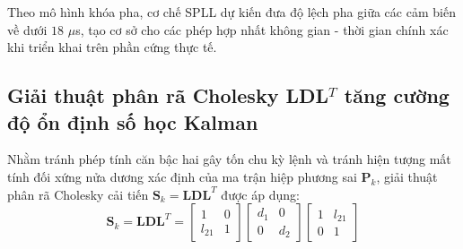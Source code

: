 \begin{table}[H]
\centering
\caption{Ước lượng độ lệch đồng bộ thời gian giữa các cảm biến đa phân giải sau khi khóa pha SPLL (mô hình hóa)}
\label{tab:pps-spll-clock-synchronization}
\end{table}

Theo mô hình khóa pha, cơ chế SPLL dự kiến đưa độ lệch pha giữa các cảm biến về dưới $18$ $\mu$s, tạo cơ sở cho các phép hợp nhất không gian - thời gian chính xác khi triển khai trên phần cứng thực tế.

\subsection{Giải thuật phân rã Cholesky \texorpdfstring{LDL$^T$}{LDLT} tăng cường độ ổn định số học Kalman}

\hspace{0.5cm} Nhằm tránh phép tính căn bậc hai gây tốn chu kỳ lệnh và tránh hiện tượng mất tính đối xứng nửa dương xác định của ma trận hiệp phương sai $\mathbf{P}_k$, giải thuật phân rã Cholesky cải tiến $\mathbf{S}_k = \mathbf{L} \mathbf{D} \mathbf{L}^T$ được áp dụng:
\begin{equation}
\mathbf{S}_k = \mathbf{L} \mathbf{D} \mathbf{L}^T = \begin{bmatrix} 1 & 0 \\ l_{21} & 1 \end{bmatrix} \begin{bmatrix} d_1 & 0 \\ 0 & d_2 \end{bmatrix} \begin{bmatrix} 1 & l_{21} \\ 0 & 1 \end{bmatrix}
\label{eq:ldlt-cholesky-factorization}
\end{equation}

